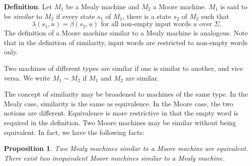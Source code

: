 \documentclass[12pt]{article}
\newtheorem{prop}{Proposition}
\begin{document}
\textbf{Definition}.  Let $M_1$ be a Mealy machine and $M_2$ a Moore machine.  $M_1$ is said to be \emph{similar} to $M_2$ if every state $s_1$ of $M_1$, there is a state $s_2$ of $M_2$ such that $$\lambda(s_1,u)=\beta(s_2,u) \mbox{  for all non-empty input words }u\mbox{ over }\Sigma.$$
The definition of a Moore machine similar to a Mealy machine is analogous.  Note that in the definition of similarity, input words are restricted to non-empty words only.

Two machines of different types are similar if one is similar to another, and vice versa.  We write $M_1 \sim M_2$ if $M_1$ and $M_2$ are similar.

The concept of similarity may be broadened to machines of the same type.  In the Mealy case, similarity is the same as equivalence.  In the Moore case, the two notions are different.  Equivalence is more restrictive in that the empty word is required in the definition.  Two Moore machines may be similar without being equivalent.  In fact, we have the following facts:

\begin{prop}  Two Mealy machines similar to a Moore machine are equivalent.  There exist two inequivalent Moore machines similar to a Mealy machine.
\end{prop}
\end{document}

